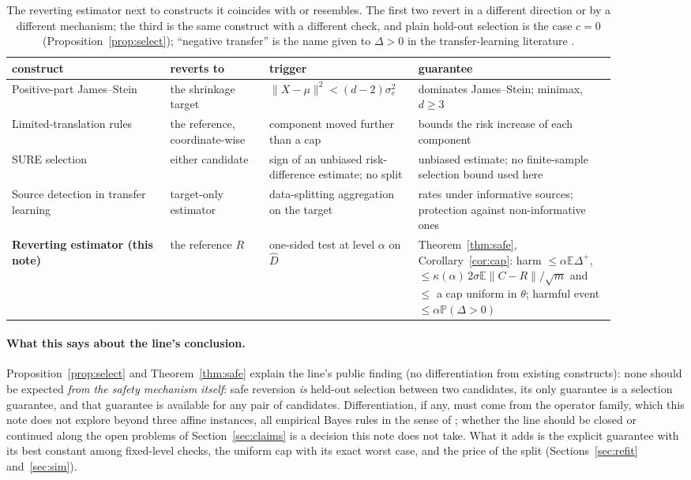 \documentclass[10pt,a4paper]{article}
\theoremstyle{plain}
\theoremstyle{definition}
\theoremstyle{remark}
\newcommand{\E}{\mathbb{E}}
\newcommand{\Prob}{\mathbb{P}}
\newcommand{\Dh}{\widehat{D}}
\newcommand{\norm}[1]{\lVert #1\rVert}
\begin{document}
\begin{table}[htb]
\centering\footnotesize
\begin{tabular}{L{0.24\linewidth}L{0.15\linewidth}L{0.2\linewidth}L{0.3\linewidth}}
\toprule
construct & reverts to & trigger & guarantee\\
\midrule
Positive-part James--Stein \citep{baranchik1970} & the shrinkage target & $\norm{X-\mu}^2<(d-2)\sigma_e^2$ & dominates James--Stein; minimax, $d\ge3$\\
Limited-translation rules \citep{efronmorris1972} & the reference, coordinate-wise & component moved further than a cap & bounds the risk increase of each component\\
SURE selection \citep{stein1981} & either candidate & sign of an unbiased risk-difference estimate; no split & unbiased estimate; no finite-sample selection bound used here\\
Source detection in transfer learning \citep{licaili2022} & target-only estimator & data-splitting aggregation on the target & rates under informative sources; protection against non-informative ones\\
\textbf{Reverting estimator (this note)} & the reference $R$ & one-sided test at level $\alpha$ on $\Dh$ & Theorem~\ref{thm:safe}, Corollary~\ref{cor:cap}: harm $\le\alpha\E\Delta^+$, $\le\kappa(\alpha)\,2\sigma\E\norm{C-R}/\sqrt m$ and $\le$ a cap uniform in $\theta$; harmful event $\le\alpha\Prob(\Delta>0)$\\
\bottomrule
\end{tabular}
\caption{The reverting estimator next to constructs it coincides with or resembles. The first two revert in a different direction or by a different mechanism; the third is the same construct with a different check, and plain hold-out selection \citep{devroye1996,arlotcelisse2010} is the case $c=0$ (Proposition~\ref{prop:select}); ``negative transfer'' is the name given to $\Delta>0$ in the transfer-learning literature \citep{panyang2010}.}
\label{tab:constructs}
\end{table}

\paragraph{What this says about the line's conclusion.}
Proposition~\ref{prop:select} and Theorem~\ref{thm:safe} explain the line's public finding (no differentiation from existing constructs): none should be expected \emph{from the safety mechanism itself}: safe reversion \emph{is} held-out selection between two candidates, its only guarantee is a selection guarantee, and that guarantee is available for any pair of candidates. Differentiation, if any, must come from the operator family, which this note does not explore beyond three affine instances, all empirical Bayes rules in the sense of \citet{efronmorris1973}; whether the line should be closed or continued along the open problems of Section~\ref{sec:claims} is a decision this note does not take. What it adds is the explicit guarantee with its best constant among fixed-level checks, the uniform cap with its exact worst case, and the price of the split (Sections~\ref{sec:refit} and~\ref{sec:sim}).
\end{document}
